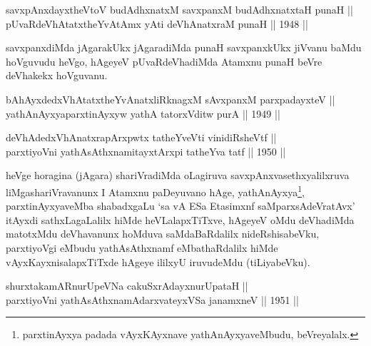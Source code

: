 
\begin{shl}
savxpAnxdayxtheVtoV budAdhxnatxM savxpanxM budAdhxnatxtaH punaH || \\
pUvaRdeVhAtatxtheYvA\s \s tAmx yAti deVhAnatxraM punaH \hfill || 1948 ||
  
\end{shl}

\begin{artha}
savxpanxdiMda jAgarakUkx jAgaradiMda punaH savxpanxkUkx jiVvanu baMdu
hoVguvudu heVgo, hAgeyeV pUvaRdeVhadiMda Atamxnu punaH beVre deVhakekx
hoVguvanu.
\end{artha}


\begin{shl}
bAhAyxdedxVhAtatxtheYvAnatxliRknagxM sAvxpanxM parxpadayxteV || \\
yathAnAyxyaparxtinAyxyw yathA tatorxVditw purA \hfill || 1949 ||
  
\end{shl}

\begin{shl}
deVhAdedxVhAnatxrapArxpwtx tatheYveVti vinidiRsheVtf ||  \\
parxtiyoVni yathAsAthxnamitayxtArxpi tatheYva tatf \hfill || 1950 ||
  
\end{shl}

\begin{artha}
heVge horagina (jAgara) shariVradiMda oLagiruva
savxpAnxvasethxyalilxruva liMgashariVravanunx I Atamxnu paDeyuvano
hAge, yathAnAyxya\footnote{parxtinAyxya padada vAyxKAyxnave
yathAnAyxyaveMbudu, beVreyalalx.}, parxtinAyxyaveMba shabadxgaLu
`sa vA ESa Etasimxnf saMparxsAdeVratAvx' itAyxdi sathxLagaLalilx hiMde heVLalapxTiTxve, hAgeyeV oMdu
deVhadiMda matotxMdu deVhavanunx hoMduva saMdaBaRdalilx
nideRshisabeVku, parxtiyoVgi eMbudu yathAsAthxnamf eMbathaRdalilx
hiMde vAyxKayxnisalapxTiTxde hAgeye ililxyU iruvudeMdu (tiLiyabeVku).
\end{artha}


\begin{shl}
shurxtakamARnurUpeVNa cakuSxrAdayxnurUpataH || \\
parxtiyoVni yathAsAthxnamAdarxvateyxVSa janamxneV \hfill || 1951 ||
  
\end{shl}

